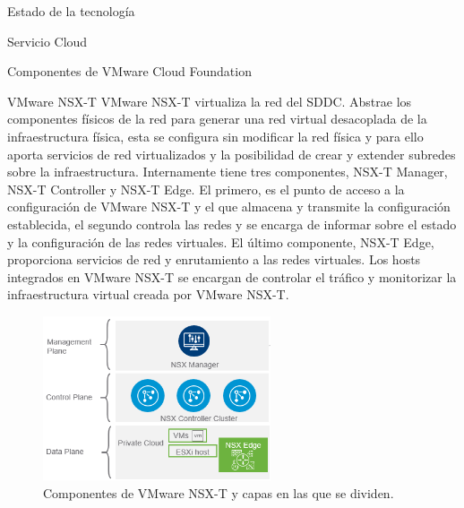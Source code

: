 \begin{chapter}{Estado de la tecnología}
\begin{section}{Servicio Cloud}
\begin{subsection}{Componentes de VMware Cloud Foundation}
    \begin{subsubsection}{VMware NSX-T}
        VMware NSX-T virtualiza la red del SDDC. Abstrae los componentes físicos de la red para generar una red virtual desacoplada de la infraestructura física, esta se configura sin modificar la red física y para ello aporta servicios de red virtualizados y la posibilidad de crear y extender subredes sobre la infraestructura. Internamente tiene tres componentes, NSX-T Manager, NSX-T Controller y NSX-T Edge. El primero, es el punto de acceso a la configuración de VMware NSX-T y el que almacena y transmite la configuración establecida, el segundo controla las redes y se encarga de informar sobre el estado y la configuración de las redes virtuales. El último componente, NSX-T Edge, proporciona servicios de red y enrutamiento a las redes virtuales. Los hosts integrados en VMware NSX-T se encargan de controlar el tráfico y monitorizar la infraestructura virtual creada por VMware NSX-T.
        \begin{figure}[h!]
            \centering
                \includegraphics[width=0.6\textwidth]{imaxes/VCF-componentes/nsx-t-layers.png}
                \caption{Componentes de VMware NSX-T y capas en las que se dividen.}
                \label{fig:nsx-t-components}
            \end{figure}
            \FloatBarrier
    \end{subsubsection}
    

\end{subsection}
\end{section}
\end{chapter}
